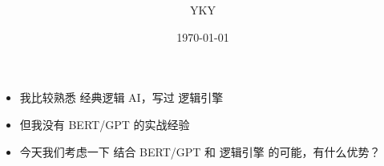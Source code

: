 

\usepackage{color}
\usepackage{mathtools}
\usepackage{hyperref}

%

\usepackage{graphicx} %
\usepackage{tikz-cd}
\usepackage{tikz}
\usepackage[export]{adjustbox}%
\usepackage{verbatim} %


\newcommand{\underdash}[1]{%
	\tikz[baseline=(toUnderline.base)]{
		\node[inner sep=1pt,outer sep=10pt] (toUnderline) {#1};
		\draw[dashed] ([yshift=-0pt]toUnderline.south west) -- ([yshift=-0pt]toUnderline.south east);
	}%
}%


\newcommand{\highlight}[1]{\colorbox{pink}{$\displaystyle #1$}}

\newcommand{\emp}[1]{{\color{violet}\textbf{#1}}}
\newcommand*\confoundFace{$\vcenter{\hbox{\texttt{[image: ../2020/../confounded-face.jpg]}}}$}
\newcommand{\underconst}{\texttt{[image: ../2020/UnderConst.png]}}
\newcommand{\witness}{\scalebox{0.6}{$\blacksquare$}}
\providecommand\Heytingarrow{\relbar\joinrel\mathrel{\vcenter{\hbox{\scalebox{0.75}{$\rhd$}}}}}



\title{\bfseries\color{blue}{\Huge《BERT 与逻辑的结合》}}
\author{YKY} %
\date{\today} %

\maketitle
{}

\begin{itemize}
	\item 我比较熟悉 经典逻辑 AI，写过 逻辑引擎
	\item 但我没有 BERT/GPT 的实战经验
	\item 今天我们考虑一下 结合 BERT/GPT 和 逻辑引擎 的可能，有什么优势？ 
\end{itemize}

